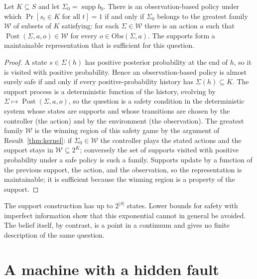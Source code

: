 \begin{newresult}\label{thm:support-safety}
Let $K\subseteq S$ and let $\Sigma_0=\operatorname{supp}b_0$. There is an observation-based policy under which $\Pr[s_t\in K\text{ for all }t]=1$ if and only if $\Sigma_0$ belongs to the greatest family $\mathcal W$ of subsets of $K$ satisfying: for each $\Sigma\in\mathcal W$ there is an action $a$ such that $\operatorname{Post}(\Sigma,a,o)\in\mathcal W$ for every $o\in\mathrm{Obs}(\Sigma,a)$. The supports form a maintainable representation that is sufficient for this question.
\end{newresult}
\begin{proof}
A state $s\in\Sigma(h)$ has positive posterior probability at the end of $h$, so it is visited with positive probability. Hence an observation-based policy is almost surely safe if and only if every positive-probability history has $\Sigma(h)\subseteq K$. The support process is a deterministic function of the history, evolving by $\Sigma\mapsto\operatorname{Post}(\Sigma,a,o)$, so the question is a safety condition in the deterministic system whose states are supports and whose transitions are chosen by the controller (the action) and by the environment (the observation). The greatest family $\mathcal W$ is the winning region of this safety game by the argument of Result~\ref{thm:kernel}: if $\Sigma_0\in\mathcal W$ the controller plays the stated actions and the support stays in $\mathcal W\subseteq 2^{K}$; conversely the set of supports visited with positive probability under a safe policy is such a family. Supports update by a function of the previous support, the action, and the observation, so the representation is maintainable; it is sufficient because the winning region is a property of the support.
\end{proof}

The support construction has up to $2^{|S|}$ states. Lower bounds for safety with imperfect information show that this exponential cannot in general be avoided. The belief itself, by contrast, is a point in a continuum and gives no finite description of the same question.


\section{A machine with a hidden fault}\label{sec:hidden-fault}

